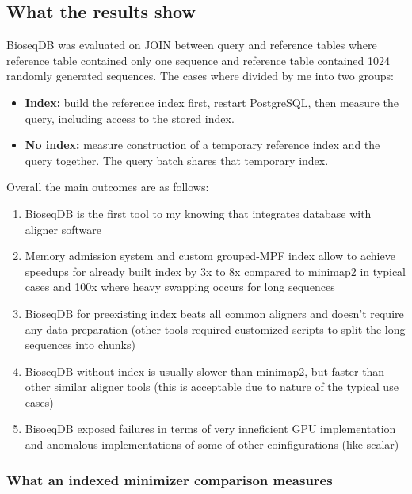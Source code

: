 \begingroup
\raggedbottom
\subsection{What the results show}
\label{sec:benchmark-interpretation}

BioseqDB was evaluated on JOIN between query and reference tables where reference table contained only one sequence and reference table contained 1024 randomly generated sequences.
The cases where divided by me into two groups:
\begin{itemize}
  \item \textbf{Index:} build the reference index first, restart PostgreSQL,
  then measure the query, including access to the stored index.
  \item \textbf{No index:} measure construction of a temporary reference index
  and the query together. The query batch shares that temporary index.
\end{itemize}

Overall the main outcomes are as follows:
\begin{enumerate}
  \item BioseqDB is the first tool to my knowing that integrates database with aligner software
  \item Memory admission system and custom grouped-MPF index allow to achieve speedups for already built index by 3x to 8x compared to minimap2 in typical cases and 100x where heavy swapping occurs for long sequences
  \item BioseqDB for preexisting index beats all common aligners and doesn't require any data preparation (other tools required customized scripts to split the long sequences into chunks)
  \item BioseqDB without index is usually slower than minimap2, but faster than other similar aligner tools (this is acceptable due to nature of the typical use cases)
  \item BisoeqDB exposed failures in terms of very inneficient GPU implementation and anomalous implementations of some of other coinfigurations (like scalar)
\end{enumerate}

\subsubsection{What an indexed minimizer comparison measures}
\label{sec:bench-indexed-minimizers}

